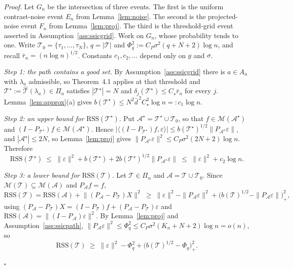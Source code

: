 \documentclass[12pt, a4paper]{article}
\newcommand{\qed}{\hfill$\square$}
\newenvironment{proof}[1][Proof]{\par\noindent\textit{#1.}\space}{\qed\par\medskip}
\newcommand{\mainthm}{Theorem~4.1}
\begin{document}
\begin{proof}
Let $G_n$ be the intersection of three events. The first is the uniform
contrast-noise event $E_n$ from Lemma~\ref{lem:noise}. The second is the
projected-noise event $F_n$ from Lemma~\ref{lem:proj}. The third is the
threshold-grid event asserted in Assumption~\ref{ass:ssicgrid}. Work on $G_n$,
whose probability tends to one. Write
$\mathcal{T}_0 = \{\tau_1,\ldots,\tau_N\}$, $q = |\mathcal{T}|$ and
$\Phi_q^2 := C_P\sigma^2(q+N+2)\log n$, and recall $\bar r_n = (n\log n)^{1/2}$.
Constants $c_1, c_2, \ldots$ depend only on $g$ and $\sigma$.

\medskip
\noindent\emph{Step 1: the path contains a good set.} By
Assumption~\ref{ass:ssicgrid} there is $a \in A_n$ with $\lambda_a$ admissible,
so \mainthm{} applies at that threshold and
$\mathcal{T}^\star := \hat{\mathcal{T}}(\lambda_a) \in \Pi_n$ satisfies
$|\mathcal{T}^\star| = N$ and $\delta_j(\mathcal{T}^\star) \le C_\star \bar r_n$
for every $j$. Lemma~\ref{lem:approx}(a) gives
$b(\mathcal{T}^\star) \le N^2 \bar d^{\,2} C_\star^2 \log n =: c_1 \log n$.

\medskip
\noindent\emph{Step 2: an upper bound for $\mathrm{RSS}(\mathcal{T}^\star)$.}
Put $\mathcal{A}^\star = \mathcal{T}^\star \cup \mathcal{T}_0$, so that
$f \in \mathcal{M}(\mathcal{A}^\star)$ and
$(I-P_{\mathcal{T}^\star})f \in \mathcal{M}(\mathcal{A}^\star)$. Hence
$|\langle (I-P_{\mathcal{T}^\star})f, \varepsilon\rangle| \le
b(\mathcal{T}^\star)^{1/2} \|P_{\mathcal{A}^\star}\varepsilon\|$, and
$|\mathcal{A}^\star| \le 2N$, so Lemma~\ref{lem:proj} gives
$\|P_{\mathcal{A}^\star}\varepsilon\|^2 \le C_P\sigma^2 (2N+2)\log n$. Therefore
\begin{equation}
\label{eq:rssstar}
\mathrm{RSS}(\mathcal{T}^\star) \;\le\; \|\varepsilon\|^2 +
b(\mathcal{T}^\star) + 2 b(\mathcal{T}^\star)^{1/2}
\|P_{\mathcal{A}^\star}\varepsilon\| \;\le\; \|\varepsilon\|^2 + c_2 \log n .
\end{equation}

\medskip
\noindent\emph{Step 3: a lower bound for $\mathrm{RSS}(\mathcal{T})$.} Let
$\mathcal{T} \in \Pi_n$ and $\mathcal{A} = \mathcal{T} \cup \mathcal{T}_0$.
Since $\mathcal{M}(\mathcal{T}) \subseteq \mathcal{M}(\mathcal{A})$ and
$P_{\mathcal{A}}f = f$,
\[
\mathrm{RSS}(\mathcal{T}) = \mathrm{RSS}(\mathcal{A}) +
\big\| (P_{\mathcal{A}} - P_{\mathcal{T}})X \big\|^2
\;\ge\; \|\varepsilon\|^2 - \|P_{\mathcal{A}}\varepsilon\|^2 +
\Big( b(\mathcal{T})^{1/2} - \|P_{\mathcal{A}}\varepsilon\| \Big)_+^2 ,
\]
using $(P_{\mathcal{A}}-P_{\mathcal{T}})X = (I-P_{\mathcal{T}})f +
(P_{\mathcal{A}}-P_{\mathcal{T}})\varepsilon$ and
$\mathrm{RSS}(\mathcal{A}) = \|(I-P_{\mathcal{A}})\varepsilon\|^2$. By
Lemma~\ref{lem:proj} and Assumption~\ref{ass:ssicpath},
$\|P_{\mathcal{A}}\varepsilon\|^2 \le \Phi_q^2 \le C_P\sigma^2(K_n+N+2)\log n = o(n)$, so
\begin{equation}
\label{eq:rsslower}
\mathrm{RSS}(\mathcal{T}) \;\ge\; \|\varepsilon\|^2 - \Phi_q^2 +
\big( b(\mathcal{T})^{1/2} - \Phi_q \big)_+^2 .
\end{equation}


\end{proof}
\end{document}
